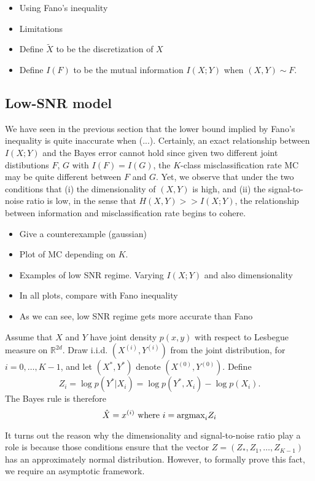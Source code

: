 \documentclass[12pt]{article}
\begin{document}
\begin{itemize}
\item Using Fano's inequality
\item Limitations
\item Define $\tilde{X}$ to be the discretization of $X$
\item Define $I(F)$ to be the mutual information $I(X;Y)$ when $(X, Y) \sim F$.
\end{itemize}

\subsection{Low-SNR model}

We have seen in the previous section that the lower bound implied by
Fano's inequality is quite inaccurate when (...).  Certainly, an exact
relationship between $I(X;Y)$ and the Bayes error cannot hold since
given two different joint distibutions $F$, $G$ with $I(F) = I(G)$,
the $K$-class misclassification rate $\text{MC}$ may be quite
different between $F$ and $G$.  Yet, we observe that under the two
conditions that (i) the dimensionality of $(X,Y)$ is high, and (ii)
the signal-to-noise ratio is low, in the sense that $H(X, Y) >>
I(X;Y)$, the relationship between information and misclassification
rate begins to cohere.

\begin{itemize}
\item Give a counterexample (gaussian)
\item Plot of $\text{MC}$ depending on $K$.
\item Examples of low SNR regime.  Varying $I(X;Y)$ and also dimensionality 
\item In all plots, compare with Fano inequality
\item As we can see, low SNR regime gets more accurate than Fano
\end{itemize}

Assume that $X$ and $Y$ have joint density $p(x, y)$ with respect to
Lesbegue measure on $\mathbb{R}^{2d}$.  Draw i.i.d. $(X^{(i)},
Y^{(i)})$ from the joint distribution, for $i = 0,\hdots, K-1$, and let
$(X^*, Y^*)$ denote $(X^{(0)}, Y^{(0)})$.  Define
\[
Z_i = \log p(Y^*|X_i) = \log p(Y^*, X_i) - \log p(X_i).
\]
The Bayes rule is therefore
\[
\hat{X} = x^{(i)} \text{ where }i = \text{argmax}_i Z_i
\]

It turns out the reason why the dimensionality and signal-to-noise
ratio play a role is because those conditions ensure that the vector
$Z = (Z_*, Z_1,\hdots, Z_{K-1})$ has an approximately normal
distribution.  However, to formally prove this fact, we require an
asymptotic framework.
\end{document}
